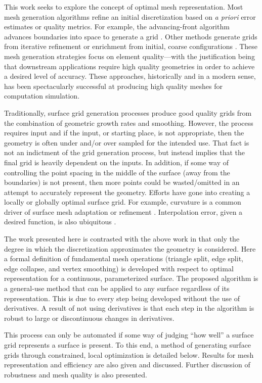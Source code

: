 This work seeks to explore the concept of optimal mesh representation.
Most mesh generation algorithms refine an initial discretization based
on {\it a priori} error estimates or quality metrics. For example, the
advancing-front algorithm advances boundaries into space to generate a
grid \cite{tristrano98, diaz-morcillo98}. Other methods generate
grids from iterative refinement or enrichment from initial, coarse
configurations \cite{marcum98, marcum00, shewchuk02}. These mesh
generation strategies focus on element quality---with the
justification being that downstream applications require high quality
geometries in order to achieve a desired level of accuracy. These
approaches, historically and in a modern sense, has been spectacularly
successful at producing high quality meshes for computation simulation.

Traditionally, surface grid generation processes produce good quality
grids from the combination of geometric growth rates and smoothing.
However, the process requires input and if the input, or starting place,
is not appropriate, then the geometry is often under and/or over sampled
for the intended use. That fact is not an indictment of the grid
generation process, but instead implies that the final grid is heavily
dependent on the inputs. In addition, if some way of controlling the
point spacing in the middle of the surface (away from the boundaries) is
not present, then more points could be wasted/omitted in an attempt to
accurately represent the geometry. Efforts have gone into
creating a locally or globally optimal surface grid. For example,
curvature is a common driver of surface mesh adaptation or refinement
\cite{siqueria13}. Interpolation error, given a desired function, 
is also ubiquitous \cite{peraire87, alauzet06, buscaglia97, huang05}.

The work presented here is contrasted with the above work in that only
the degree in which the discretization approximates the geometry is
considered.  Here a formal definition of fundamental mesh operations
(triangle split, edge split, edge collapse, and vertex smoothing) is
developed with respect to optimal representation for a continuous,
parameterized surface. The proposed algorithm is a general-use method
that can be applied to any surface regardless of its representation.
This is due to every step being developed without the use of
derivatives. A result of not using derivatives is that each step in the
algorithm is robust to large or discontinuous changes in derivatives.

This process can only be automated if some way of judging ``how well'' a
surface grid represents a surface is present. To this end, a method of
generating surface grids through constrained, local optimization is
detailed below. Results for mesh representation and efficiency are also
given and discussed.  Further discussion of robustness and mesh quality
is also presented.

